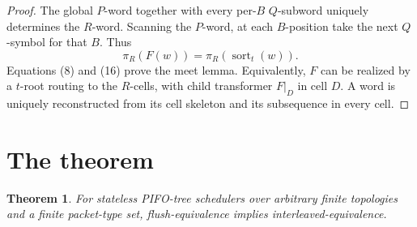 \documentclass[11pt]{article}
\newtheorem{theorem}[definition]{Theorem}
\begin{document}
\begin{proof}
The global $P$-word together with every per-$B$ $Q$-subword uniquely determines the $R$-word.  Scanning the $P$-word, at each $B$-position take the next $Q$-symbol for that $B$.  Thus
\begin{equation}
\pi_R(F(w))
=
\pi_R(\operatorname{sort}_t(w)).
\tag{16}
\end{equation}
Equations (8) and (16) prove the meet lemma.  Equivalently, $F$ can be realized by a $t$-root routing to the $R$-cells, with child transformer $F|_D$ in cell $D$.  A word is uniquely reconstructed from its cell skeleton and its subsequence in every cell.
\end{proof}

\section{The theorem}

\begin{theorem}
For stateless PIFO-tree schedulers over arbitrary finite topologies and a finite packet-type set, flush-equivalence implies interleaved-equivalence.
\end{theorem}
\end{document}
